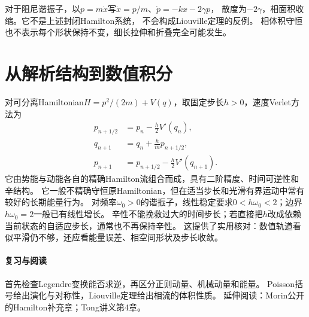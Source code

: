 对于阻尼谐振子，以$p = m\dot x$写$\dot x = p/m$、$\dot p = -kx - 2\gamma p$，
散度为$-2\gamma$，相面积收缩。它不是上述封闭Hamilton系统，
不会构成Liouville定理的反例。
相体积守恒也不表示每个形状保持不变，细长拉伸和折叠完全可能发生。

\section{从解析结构到数值积分}
对可分离Hamiltonian$H = p^2/(2m) + V(q)$，取固定步长$h > 0$，速度Verlet方法为
\begin{align}
 p_{n+1/2} &= p_n - \frac h2V'(q_n),\\
 q_{n+1} &= q_n + \frac hm p_{n+1/2},\\
 p_{n+1} &= p_{n+1/2} - \frac h2V'(q_{n+1}).
\end{align}
它由势能与动能各自的精确Hamilton流组合而成，具有二阶精度、时间可逆性和辛结构。
它一般不精确守恒原Hamiltonian，但在适当步长和光滑有界运动中常有较好的长期能量行为。
对频率$\omega_0 > 0$的谐振子，线性稳定要求$0 < h\omega_0 < 2$；边界$h\omega_0 = 2$一般已有线性增长。
辛性不能挽救过大的时间步长；若直接把$h$改成依赖当前状态的自适应步长，通常也不再保持辛性。
这提供了实用核对：数值轨道看似平滑仍不够，还应看能量误差、相空间形状及步长收敛。

\paragraph{复习与阅读}
首先检查Legendre变换能否求逆，再区分正则动量、机械动量和能量。
Poisson括号给出演化与对称性，Liouville定理给出相流的体积性质。
延伸阅读：Morin公开的Hamilton补充章；Tong讲义第4章。

